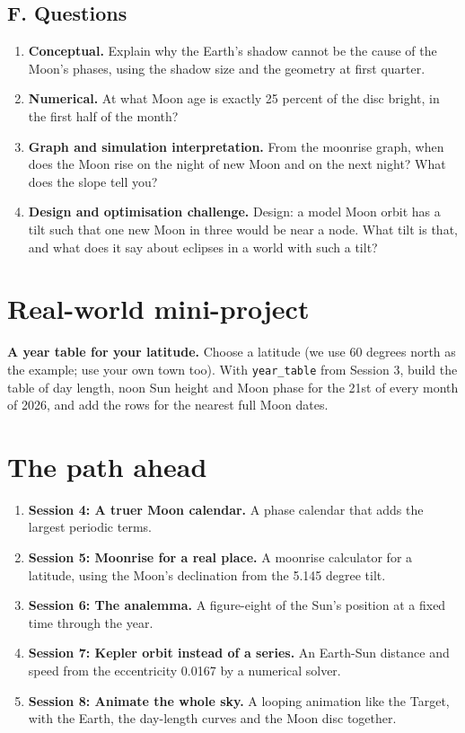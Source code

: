 \documentclass[11pt,a4paper]{article}
\begin{document}
\subsection*{F. Questions}
\begin{enumerate}[nosep]
\item \textbf{Conceptual.} Explain why the Earth's shadow cannot be the cause of the Moon's phases, using the shadow size and the geometry at first quarter.
\item \textbf{Numerical.} At what Moon age is exactly 25 percent of the disc bright, in the first half of the month?
\item \textbf{Graph and simulation interpretation.} From the moonrise graph, when does the Moon rise on the night of new Moon and on the next night? What does the slope tell you?
\item \textbf{Design and optimisation challenge.} Design: a model Moon orbit has a tilt such that one new Moon in three would be near a node. What tilt is that, and what does it say about eclipses in a world with such a tilt?
\end{enumerate}

\section{Real-world mini-project}
\textbf{A year table for your latitude.} Choose a latitude (we use 60 degrees north as the example; use your own town too). With \texttt{year\_table} from Session 3, build the table of day length, noon Sun height and Moon phase for the 21st of every month of 2026, and add the rows for the nearest full Moon dates.

\section{The path ahead}
\begin{enumerate}[nosep]
\item \textbf{Session 4: A truer Moon calendar.} A phase calendar that adds the largest periodic terms.
\item \textbf{Session 5: Moonrise for a real place.} A moonrise calculator for a latitude, using the Moon's declination from the 5.145 degree tilt.
\item \textbf{Session 6: The analemma.} A figure-eight of the Sun's position at a fixed time through the year.
\item \textbf{Session 7: Kepler orbit instead of a series.} An Earth-Sun distance and speed from the eccentricity 0.0167 by a numerical solver.
\item \textbf{Session 8: Animate the whole sky.} A looping animation like the Target, with the Earth, the day-length curves and the Moon disc together.
\end{enumerate}
\end{document}
